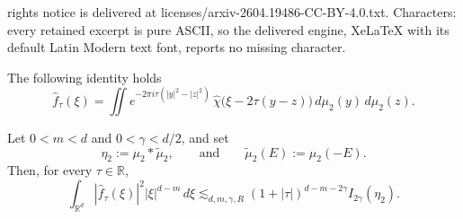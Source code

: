 \documentclass[10pt,a4paper]{amsart}
\newcommand{\Rd}{\mathbb{R}^d}
\newcommand{\R}{\mathbb{R}}
\begin{document}
rights notice is delivered at licenses/arxiv-2604.19486-CC-BY-4.0.txt. Characters: every retained excerpt is pure ASCII, so the delivered engine, XeLaTeX with its default Latin Modern text font, reports no missing character.
\begin{lemma}
The following identity holds
\begin{equation}\label{eq:fhat-theta1-theta2}
\widehat f_{\tau}(\xi)
=
\iint e^{-2\pi i\tau(|y|^2-|z|^2)}\,\widehat\chi\bigl(\xi-2\tau(y-z)\bigr)
\,d\mu_2(y)\,d\mu_2(z).
\end{equation}
\end{lemma}

\begin{lemma}\label{lem:agenera}
Let $0<m<d$ and $0<\gamma<d/2$, and set
\[
\eta_2:=\mu_2*\widetilde\mu_2,
\qquad \text{and} \qquad 
\widetilde\mu_2(E):=\mu_2(-E).
\]
Then, for every $\tau\in\R$,
\begin{equation}\label{eq:L2-weighted-general}
\int_{\Rd}|\widehat f_{\tau}(\xi)|^2|\xi|^{d-m}\,d\xi
\lesssim_{d,m,\gamma,R}
(1+|\tau|)^{d-m-2\gamma}I_{2\gamma}(\eta_2).
\end{equation}
\end{lemma}
\end{document}
